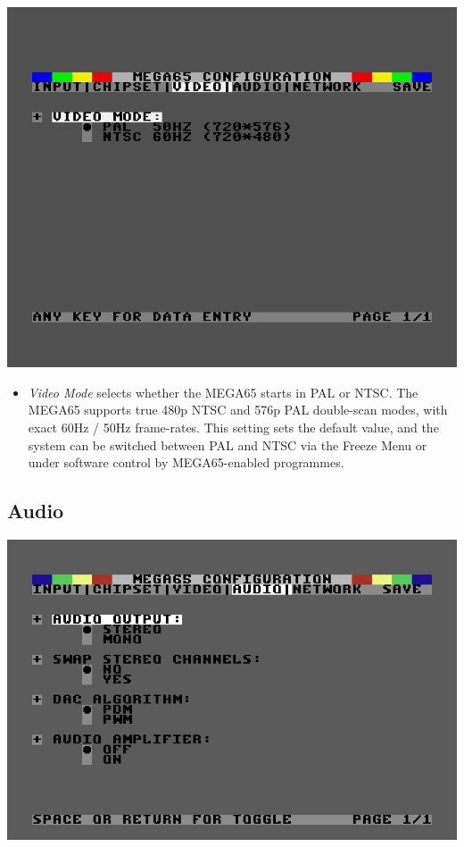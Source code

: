 \includegraphics[width=\linewidth]{images/ss-m65config-3.png}

\begin{itemize}
  \item{\em Video Mode} selects whether the MEGA65 starts in PAL or NTSC.    The MEGA65 supports true 480p NTSC and 576p PAL double-scan modes, with exact 60Hz / 50Hz frame-rates. This setting sets the default value, and the system can be switched between PAL and NTSC via the Freeze Menu or under software control by MEGA65-enabled programmes.
\end{itemize}

\subsection{Audio}

\includegraphics[width=\linewidth]{images/ss-m65config-4.png}

